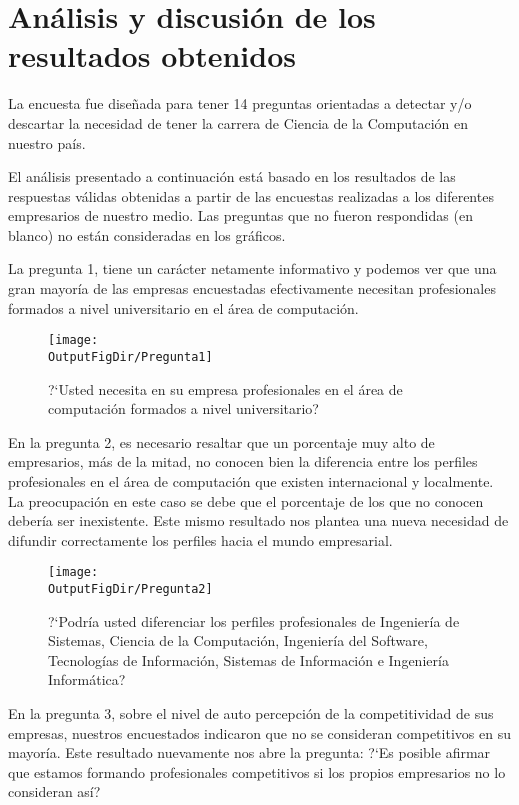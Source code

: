 \section{Análisis y discusión de los resultados obtenidos}\label{sec:cs-resultados-de-la-encuesta}

La encuesta fue diseñada para tener 14 preguntas orientadas a detectar y/o descartar la necesidad de tener la carrera de Ciencia de la Computación en nuestro país.

El análisis presentado a continuación está basado en los resultados de las respuestas válidas obtenidas a partir de las encuestas realizadas a los diferentes empresarios de nuestro medio. Las preguntas que no fueron respondidas (en blanco) no están consideradas en los gráficos.

La pregunta 1, tiene un carácter netamente informativo y podemos ver que una gran mayoría de las empresas encuestadas efectivamente necesitan profesionales formados a nivel universitario en el área de computación.

\newcommand{\mywidth}{10cm}

\begin{figure}[!h]
	\centering
	\texttt{[image: \\OutputFigDir/Pregunta1]}
	\label{fig:Preg1}
	\caption{?`Usted necesita en su empresa profesionales en el área de computación formados a nivel universitario?}
\end{figure}


En la pregunta 2, es necesario resaltar que un porcentaje muy alto de empresarios, más de la mitad, no conocen bien la diferencia entre los perfiles profesionales en el área de computación que existen internacional y localmente. La preocupación en este caso se debe que el porcentaje de los que no conocen debería ser inexistente. Este mismo resultado nos plantea una nueva necesidad de difundir correctamente los perfiles hacia el mundo empresarial.


\begin{figure}[!h]
	\centering
	\texttt{[image: \\OutputFigDir/Pregunta2]}
	\label{fig:Preg2}
	\caption{?`Podría usted diferenciar los perfiles profesionales de Ingeniería de Sistemas, Ciencia de la Computación, Ingeniería del Software, Tecnologías de Información, Sistemas de Información e Ingeniería Informática?}
\end{figure}

En la pregunta 3, sobre el nivel de auto percepción de la competitividad de sus empresas, nuestros encuestados indicaron que no se consideran competitivos en su mayoría. Este resultado nuevamente nos abre la pregunta: ?`Es posible afirmar que estamos formando profesionales competitivos si los propios empresarios no lo consideran así?

